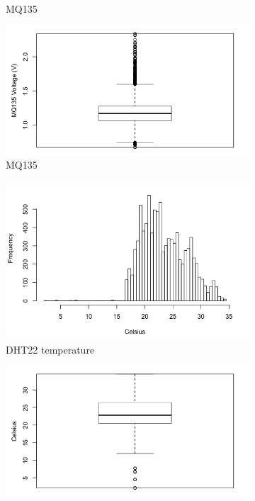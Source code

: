 \documentclass[11pt]{report}
\begin{document}
\begin{figure}[!tbp]
\begin{minipage}{1\linewidth}
\begin{subfigure}[t]{.4\linewidth}
                \caption{MQ135}
                \label{fig:mq135_histogram}
            \end{subfigure}
            \hfill
            \begin{subfigure}[t]{.4\linewidth}
            	\includegraphics[width=\textwidth]{images/mq135_boxplot}
            	\caption{MQ135}
            	\label{fig:mq135_boxplot}
	   \end{subfigure}
        \end{minipage}
    \begin{minipage}{1\linewidth}
            \begin{subfigure}[t]{.4\linewidth}
                \includegraphics[width=\textwidth]{images/temp_histogram}
                \caption{DHT22 temperature}
                \label{fig:temp_histogram}
            \end{subfigure}
            \hfill
            \begin{subfigure}[t]{.4\linewidth}
            	\includegraphics[width=\textwidth]{images/temp_boxplot}

\end{subfigure}
\end{minipage}
\end{figure}
\end{document}
